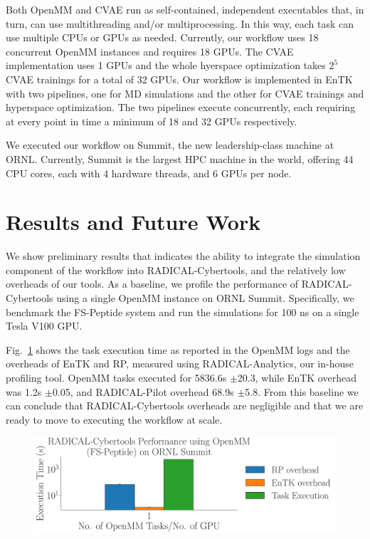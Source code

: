 \documentclass[conference,final]{IEEEtran}
\begin{document}
Both OpenMM and CVAE run as self-contained, independent executables that, in
turn, can use multithreading and/or multiprocessing. In this way, each task
can use multiple CPUs or GPUs as needed. Currently, our workflow uses 18
concurrent OpenMM instances and requires 18 GPUs. The CVAE implementation
uses 1 GPUs and the whole hyerspace optimization takes $2^5$ CVAE trainings
for a total of 32 GPUs. Our workflow is implemented in EnTK with two
pipelines, one for MD simulations and the other for CVAE trainings and
hyperspace optimization. The two pipelines execute concurrently, each
requiring at every point in time a minimum of 18 and 32 GPUs respectively.

We executed our workflow on Summit, the new leadership-class machine at
ORNL\@. Currently, Summit is the largest HPC machine in the world, offering
44 CPU cores, each with 4 hardware threads, and 6 GPUs per node.


\section{Results and Future Work}

We show preliminary results that indicates the ability to integrate the
simulation component of the workflow into RADICAL-Cybertools, and the
relatively low overheads of our tools.  As a baseline, we profile the
performance of RADICAL-Cybertools using a single OpenMM instance on ORNL
Summit. Specifically, we benchmark the FS-Peptide system and run the
simulations for 100 ns on a single Tesla V100 GPU. 

Fig.~\ref{fig:single_openmm} shows the task execution time as reported in the
OpenMM logs and the overheads of EnTK and RP, measured using
RADICAL-Analytics, our in-house profiling tool. OpenMM tasks executed for
5836.6s $\pm$20.3, while EnTK overhead was 1.2s $\pm$0.05, and
RADICAL-Pilot overhead 68.9s $\pm$5.8. From this baseline we can
conclude that RADICAL-Cybertools overheads are negligible and that we are
ready to move to executing the workflow at scale.

\begin{figure}
    \centering
    \includegraphics[width=.8\textwidth]{single_openmm}
    \caption{}
    \label{fig:single_openmm}
\end{figure}





\end{document}
